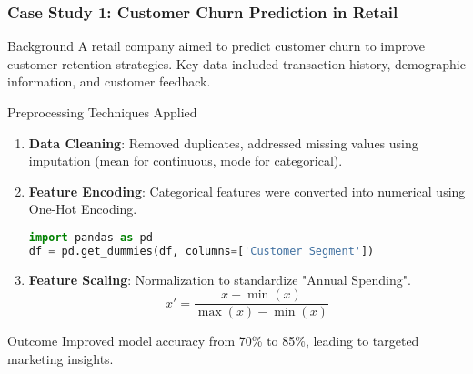 \documentclass[aspectratio=169]{beamer}
\begin{document}
\begin{frame}[fragile]
    \frametitle{Case Study 1: Customer Churn Prediction in Retail}
    
    \begin{block}{Background}
        A retail company aimed to predict customer churn to improve customer retention strategies. Key data included transaction history, demographic information, and customer feedback.
    \end{block}

    \begin{block}{Preprocessing Techniques Applied}
        \begin{enumerate}
            \item \textbf{Data Cleaning}: Removed duplicates, addressed missing values using imputation (mean for continuous, mode for categorical).
            \item \textbf{Feature Encoding}: Categorical features were converted into numerical using One-Hot Encoding.
            \begin{lstlisting}[language=Python]
import pandas as pd
df = pd.get_dummies(df, columns=['Customer Segment'])
            \end{lstlisting}
            \item \textbf{Feature Scaling}: Normalization to standardize "Annual Spending". 
            \begin{equation}
                x' = \frac{x - \min(x)}{\max(x) - \min(x)}
            \end{equation}
        \end{enumerate}
    \end{block}
    
    \begin{block}{Outcome}
        Improved model accuracy from 70\% to 85\%, leading to targeted marketing insights.
    \end{block}
\end{frame}
\end{document}
